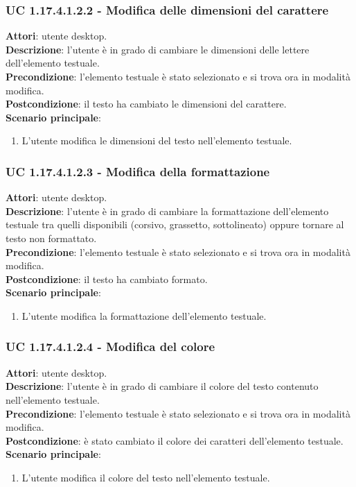 \subsubsection{UC 1.17.4.1.2.2 - Modifica delle dimensioni del carattere}{
	\label{uc1.17.4.1.2.2}
	\textbf{Attori}: utente desktop. \\
	\textbf{Descrizione}: l'utente è in grado di cambiare le dimensioni delle lettere dell’elemento testuale. \\
	\textbf{Precondizione}: l'elemento testuale è stato selezionato e si trova ora in modalità modifica.\\
	\textbf{Postcondizione}: il testo ha cambiato le dimensioni del carattere.\\
	\textbf{Scenario principale}:
	\begin{enumerate}
		\item L'utente modifica le dimensioni del testo nell'elemento testuale.
	\end{enumerate}	
	}
\subsubsection{UC 1.17.4.1.2.3 - Modifica della formattazione}{
	\label{uc1.17.4.1.2.3}
	\textbf{Attori}: utente desktop. \\
	\textbf{Descrizione}: l'utente è in grado di cambiare la formattazione dell’elemento testuale tra quelli disponibili (corsivo, grassetto, sottolineato) oppure tornare al testo non formattato. \\
	\textbf{Precondizione}: l'elemento testuale è stato selezionato e si trova ora in modalità modifica.\\
	\textbf{Postcondizione}: il testo ha cambiato formato.\\
	\textbf{Scenario principale}:
	\begin{enumerate}
		\item L'utente modifica la formattazione dell'elemento testuale.
	\end{enumerate}			
	}
\subsubsection{UC 1.17.4.1.2.4 - Modifica del colore}{
	\label{uc1.17.4.1.2.4}
	\textbf{Attori}: utente desktop. \\
	\textbf{Descrizione}: l'utente è in grado di cambiare il colore del testo contenuto nell’elemento testuale. \\
	\textbf{Precondizione}: l'elemento testuale è stato selezionato e si trova ora in modalità modifica.\\
	\textbf{Postcondizione}: è stato cambiato il colore dei caratteri dell'elemento testuale.\\
	\textbf{Scenario principale}:
	\begin{enumerate}
		\item L'utente modifica il colore del testo nell'elemento testuale.
	\end{enumerate}			
	}
